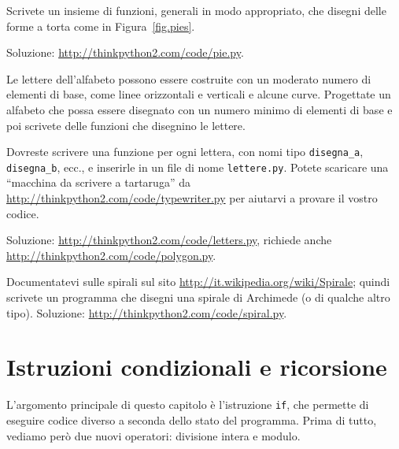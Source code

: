 \documentclass[10pt]{book}
\begin{document}
\vspace{0.2in}
\begin{exercise}

Scrivete un insieme di funzioni, generali in modo appropriato, che disegni delle forme a torta come in Figura~\ref{fig.pies}.

Soluzione: \url{http://thinkpython2.com/code/pie.py}.

\end{exercise}

\vspace{0.2in}
\begin{exercise}

Le lettere dell'alfabeto possono essere costruite con un moderato numero di elementi di base, come linee orizzontali e verticali e alcune curve. Progettate un alfabeto che possa essere disegnato con un numero minimo di elementi di base e poi scrivete delle funzioni che disegnino le lettere.

Dovreste scrivere una funzione per ogni lettera, con nomi tipo
\verb"disegna_a", \verb"disegna_b", ecc., e inserirle in un file di nome {\tt lettere.py}.  Potete scaricare una ``macchina da scrivere a tartaruga'' da \url{http://thinkpython2.com/code/typewriter.py}
per aiutarvi a provare il vostro codice.

Soluzione: \url{http://thinkpython2.com/code/letters.py}, richiede anche
\url{http://thinkpython2.com/code/polygon.py}.

\end{exercise}

\vspace{0.2in}
\begin{exercise}

Documentatevi sulle spirali sul sito \url{http://it.wikipedia.org/wiki/Spirale}; quindi scrivete un programma che disegni una spirale di Archimede (o di qualche altro tipo).  Soluzione: \url{http://thinkpython2.com/code/spiral.py}.

\end{exercise}


\chapter{Istruzioni condizionali e ricorsione}

L'argomento principale di questo capitolo è l'istruzione {\tt if}, che permette di eseguire codice diverso a seconda dello stato del programma. Prima di tutto, vediamo però due nuovi operatori: divisione intera e modulo.
\end{document}
